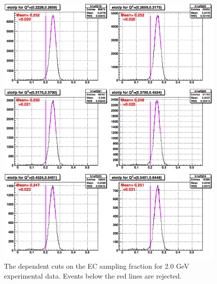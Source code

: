 \begin{figure}[H]%
\centering
\leavevmode \includegraphics[width=1.0\textwidth]{figuresEG4/FigCuts/ecCuts_sfOneD_Eb2_4ThN.png}  %
\caption[EC sampling fraction cut (Exp.)]{The \qsqs dependent cuts on the EC sampling fraction for 2.0 GeV experimental data. Events below the red lines are rejected.}
\label{ecSfExp6}
\end{figure}



